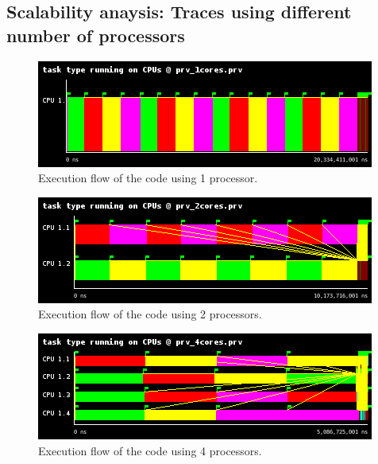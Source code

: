 \documentclass[12pt, a4paper]{article}
\begin{document}
\subsection{Scalability anaysis: Traces using different number of processors}

\begin{figure}[H]
	\centering
	\includegraphics[scale=0.75]{./images/S1_scalability/S1_scalability_1}
	
	\label{fig_ann:S1_scalability_1}
	\caption{Execution flow of the code using 1 processor.}
\end{figure}





\begin{figure}[H]
	\centering
	\includegraphics[scale=0.75]{./images/S1_scalability/S1_scalability_2}
	
	\label{fig_ann:S1_scalability_2}
	\caption{Execution flow of the code using 2 processors.}
\end{figure}





\begin{figure}[H]
	\centering
	\includegraphics[scale=0.75]{./images/S1_scalability/S1_scalability_4}
	
	\label{fig_ann:S1_scalability_4}
	\caption{Execution flow of the code using 4 processors.}
\end{figure}
\end{document}
